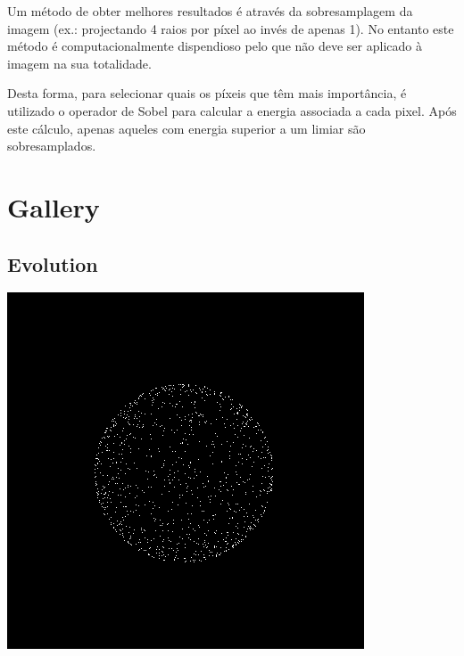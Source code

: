 \documentclass[a4paper]{article}
\begin{document}
\indent Um método de obter melhores resultados é através da sobresamplagem da imagem (ex.: projectando
4 raios por píxel ao invés de apenas 1). No entanto este método é computacionalmente dispendioso pelo que não
deve ser aplicado à imagem na sua totalidade.

\indent Desta forma, para selecionar quais os píxeis que têm mais importância, é utilizado o operador de Sobel
para calcular a energia associada a cada pixel. Após este cálculo, apenas aqueles com energia superior a um limiar
são sobresamplados.

\cleardoublepage
\section{Gallery}
\subsection{Evolution}
\begin{center}
	\includegraphics[scale=0.50]{images/gallery/photon_projection.png}
	\label{fig:photon_projection}
\end{center}
\end{document}
